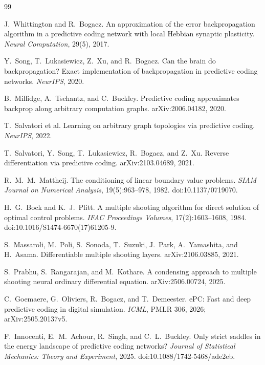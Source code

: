 \documentclass[11pt]{article}
\begin{document}
\begin{thebibliography}{99}
\raggedright

 J.~Whittington and R.~Bogacz.
An approximation of the error backpropagation algorithm in a predictive coding network
with local Hebbian synaptic plasticity. \emph{Neural Computation}, 29(5), 2017.

 Y.~Song, T.~Lukasiewicz, Z.~Xu, and R.~Bogacz.
Can the brain do backpropagation? Exact implementation of backpropagation in predictive
coding networks. \emph{NeurIPS}, 2020.

 B.~Millidge, A.~Tschantz, and C.~Buckley.
Predictive coding approximates backprop along arbitrary computation graphs.
arXiv:2006.04182, 2020.

 T.~Salvatori et al.
Learning on arbitrary graph topologies via predictive coding. \emph{NeurIPS}, 2022.

 T.~Salvatori, Y.~Song, T.~Lukasiewicz,
R.~Bogacz, and Z.~Xu.
Reverse differentiation via predictive coding. arXiv:2103.04689, 2021.

 R.~M.~M.~Mattheij.
The conditioning of linear boundary value problems.
\emph{SIAM Journal on Numerical Analysis}, 19(5):963--978, 1982.
doi:10.1137/0719070.

 H.~G.~Bock and K.~J.~Plitt.
A multiple shooting algorithm for direct solution of optimal control problems.
\emph{IFAC Proceedings Volumes}, 17(2):1603--1608, 1984.
doi:10.1016/S1474-6670(17)61205-9.

 S.~Massaroli, M.~Poli, S.~Sonoda, T.~Suzuki,
J.~Park, A.~Yamashita, and H.~Asama.
Differentiable multiple shooting layers. arXiv:2106.03885, 2021.

 S.~Prabhu, S.~Rangarajan, and M.~Kothare.
A condensing approach to multiple shooting neural ordinary differential equation.
arXiv:2506.00724, 2025.

 C.~Goemaere, G.~Oliviers, R.~Bogacz, and T.~Demeester.
ePC: Fast and deep predictive coding in digital simulation.
\emph{ICML}, PMLR 306, 2026; arXiv:2505.20137v5.

 F.~Innocenti, E.~M.~Achour, R.~Singh, and C.~L.~Buckley.
Only strict saddles in the energy landscape of predictive coding networks?
\emph{Journal of Statistical Mechanics: Theory and Experiment}, 2025.
doi:10.1088/1742-5468/ade2eb.


\end{thebibliography}
\end{document}
